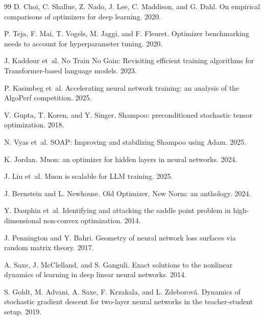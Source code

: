 \documentclass[10pt]{article}
\begin{document}
\begin{thebibliography}{99}\small
{}
D. Choi, C. Shallue, Z. Nado, J. Lee, C. Maddison, and G. Dahl.
On empirical comparisons of optimizers for deep learning. 2020.

P. Teja, F. Mai, T. Vogels, M. Jaggi, and F. Fleuret.
Optimizer benchmarking needs to account for hyperparameter tuning. 2020.

J. Kaddour et~al.
No Train No Gain: Revisiting efficient training algorithms for Transformer-based language models. 2023.

P. Kasimbeg et~al.
Accelerating neural network training: an analysis of the AlgoPerf competition. 2025.

V. Gupta, T. Koren, and Y. Singer.
Shampoo: preconditioned stochastic tensor optimization. 2018.

N. Vyas et~al.
SOAP: Improving and stabilizing Shampoo using Adam. 2025.

K. Jordan.
Muon: an optimizer for hidden layers in neural networks. 2024.

J. Liu et~al.
Muon is scalable for LLM training. 2025.

J. Bernstein and L. Newhouse.
Old Optimizer, New Norm: an anthology. 2024.

Y. Dauphin et~al.
Identifying and attacking the saddle point problem in high-dimensional non-convex optimization. 2014.

J. Pennington and Y. Bahri.
Geometry of neural network loss surfaces via random matrix theory. 2017.

A. Saxe, J. McClelland, and S. Ganguli.
Exact solutions to the nonlinear dynamics of learning in deep linear neural networks. 2014.

S. Goldt, M. Advani, A. Saxe, F. Krzakala, and L. Zdeborov\'a.
Dynamics of stochastic gradient descent for two-layer neural networks in the teacher-student setup. 2019.
\end{thebibliography}
\end{document}
